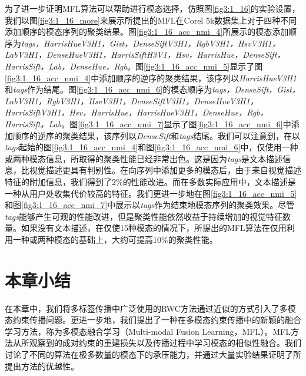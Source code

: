 为了进一步证明MFL算法可以帮助进行模态选择，仿照图\ref{fig3:1_16}的实验设置，我们以图\ref{fig3:1_16_more}来展示所提出的MFL在Corel 5k数据集上对于四种不同添加顺序的模态序列的聚类结果。图\ref{fig3:1_16_acc_nmi_4}所展示的模态添加顺序为\textit{tags，HarrisHueV3H1，Gist，DenseSiftV3H1，RgbV3H1，HsvV3H1，LabV3H1，DenseHueV3H1，HarrisSiftH3V1，Hsv，HarrisHue，DenseSift，HarrisSift，Lab，DenseHue，Rgb}。图\ref{fig3:1_16_acc_nmi_5}显示了图\ref{fig3:1_16_acc_nmi_4}中添加顺序的逆序的聚类结果，该序列以\textit{HarrisHueV3H1}和\textit{tags}作为结尾。图\ref{fig3:1_16_acc_nmi_6}的模态顺序为\textit{tags，DenseSift，Gist，LabV3H1，RgbV3H1，HsvV3H1，DenseSiftV3H1，DenseHueV3H1，HarrisSiftV3H1，Hsv，HarrisHue，HarrisHueV3H1，DenseHue，Rgb，HarrisSift，Lab}。图\ref{fig3:1_16_acc_nmi_7}显示了图\ref{fig3:1_16_acc_nmi_6}中添加顺序的逆序的聚类结果，该序列以\textit{DenseSift}和\textit{tags}结尾。我们可以注意到，在以\textit{tags}起始的图\ref{fig3:1_16_acc_nmi_4}和图\ref{fig3:1_16_acc_nmi_6}中，仅使用一种或两种模态信息，所取得的聚类性能已经非常出色。这是因为\textit{tags}是文本描述信息，比视觉描述更具有判别性。在向序列中添加更多的模态后，由于来自视觉描述特征的附加信息，我们得到了$2\%$的性能改进。而在多数实际应用中，文本描述是一种从用户处收集代价较高的特征。我们更进一步地在图\ref{fig3:1_16_acc_nmi_5}和图\ref{fig3:1_16_acc_nmi_7}中展示以\textit{tags}作为结束地模态序列的聚类效果。尽管\textit{tags}能够产生可观的性能改进，但是聚类性能依然收益于持续增加的视觉特征数量。如果没有文本描述，在仅使15种模态的情况下，所提出的MFL算法在仅用利用一种或两种模态的基础上，大约可提高$10\%$的聚类性能。

\section{本章小结}
在本章中，我们将多标签传播中广泛使用的RWC方法通过近似的方式引入了多模态约束传播问题。更进一步地，我们提出了一种在多模态约束传播中的新颖的融合学习方法，称为多模态融合学习（Multi-modal Fusion Learning，MFL）。MFL方法从所观察到的成对约束的重建损失以及传播过程中学习模态的相似性融合。我们讨论了不同的算法在极多数量的模态下的承压能力，并通过大量实验结果证明了所提出方法的优越性。